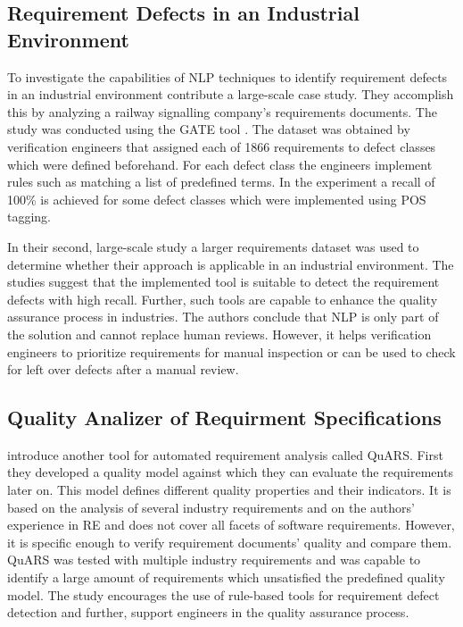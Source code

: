 \subsection{Requirement Defects in an Industrial Environment}
To investigate the capabilities of \ac{NLP} techniques to identify requirement defects in an industrial environment \textcite{Rosadini:2017} contribute a large-scale case study.
They accomplish this by analyzing a railway signalling company's requirements documents.
The study was conducted using the \ac{GATE} tool \parencite{Cunningham:2002}.
The dataset was obtained by verification engineers that assigned each of 1866 requirements to defect classes which were defined beforehand.
For each defect class the engineers implement rules such as matching a list of predefined terms.
In the experiment a recall of 100\% is achieved for some defect classes which were implemented using \ac{POS} tagging.

In their second, large-scale study a larger requirements dataset was used to determine whether their approach is applicable in an industrial environment.
The studies suggest that the implemented tool is suitable to detect the requirement defects with high recall.
Further, such tools are capable to enhance the quality assurance process in industries.
The authors conclude that \ac{NLP} is only part of the solution and cannot replace human reviews.
However, it helps verification engineers to prioritize requirements for manual inspection or can be used to check for left over defects after a manual review.

\subsection{Quality Analizer of Requirment Specifications}
\textcite{Fabbrini:2002} introduce another tool for automated requirement analysis called \ac{QuARS}.
First they developed a quality model against which they can evaluate the requirements later on.
This model defines different quality properties and their indicators.
It is based on the analysis of several industry requirements and on the authors' experience in \ac{RE} and does not cover all facets of software requirements.
However, it is specific enough to verify requirement documents' quality and compare them.
\Ac{QuARS} was tested with multiple industry requirements and was capable to identify a large amount of requirements which unsatisfied the predefined quality model.
The study encourages the use of rule-based tools for requirement defect detection and further, support engineers in the quality assurance process.

